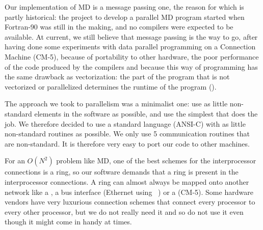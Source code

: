 Our implementation of MD is a message passing one, the reason for which
is partly historical: the project to develop a parallel MD program started
when Fortran-90 was still in the making, and no compilers were
expected to be available. 
At current, we still believe that message passing is the way
to go, after having done some experiments with data parallel programming on a
Connection Machine (CM-5), because of portability to other hardware,
the poor performance of the code produced by the compilers 
and because this way of programming
has the same drawback as vectorization: the part of the program that is
not vectorized or parallelized determines the runtime of the program
().

The approach we took to parallelism was a minimalist one: use as little
non-standard elements in the software as possible, and use the
simplest  that does the job. We therefore 
decided to use a standard language (ANSI-C) with as little non-standard
routines as possible. We only use 5 communication routines that are
non-standard. It is therefore very easy to port our code to other machines.

For an $O(N^2)$ problem like MD, one of the best schemes for the
interprocessor connections is a ring, so our software demands that a
ring is present in the interprocessor connections. A ring can almost
always be mapped onto another network like a , a
bus interface (Ethernet {\eg} using  ~\cite{pvm3}) or a 
(CM-5). Some hardware vendors have very luxurious connection schemes
that connect every processor to every other processor, but we do not
really need it and so do not use it even though it might come in handy
at times.

